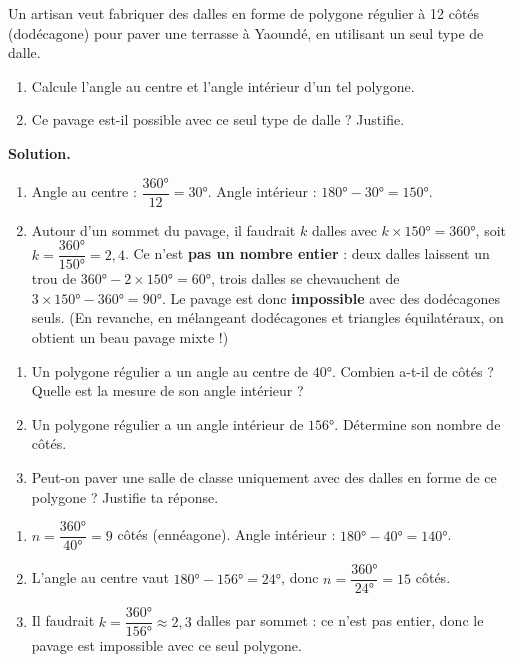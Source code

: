 \documentclass[11pt]{article}
\begin{document}
\begin{exoresolu}
Un artisan veut fabriquer des dalles en forme de polygone régulier à 12 côtés (dodécagone) pour paver une terrasse à Yaoundé, en utilisant un seul type de dalle.
\begin{enumerate}
\item Calcule l'angle au centre et l'angle intérieur d'un tel polygone.
\item Ce pavage est-il possible avec ce seul type de dalle ? Justifie.
\end{enumerate}
\tcblower
\textbf{Solution.}
\begin{enumerate}
\item Angle au centre : $\dfrac{360°}{12} = 30°$. Angle intérieur : $180° - 30° = 150°$.
\item Autour d'un sommet du pavage, il faudrait $k$ dalles avec $k \times 150° = 360°$, soit $k = \dfrac{360°}{150°} = 2{,}4$. Ce n'est \textbf{pas un nombre entier} : deux dalles laissent un trou de $360° - 2 \times 150° = 60°$, trois dalles se chevauchent de $3 \times 150° - 360° = 90°$. Le pavage est donc \textbf{impossible} avec des dodécagones seuls. (En revanche, en mélangeant dodécagones et triangles équilatéraux, on obtient un beau pavage mixte !)
\end{enumerate}
\end{exoresolu}

\begin{exercice}
\begin{enumerate}
\item Un polygone régulier a un angle au centre de $40°$. Combien a-t-il de côtés ? Quelle est la mesure de son angle intérieur ?
\item Un polygone régulier a un angle intérieur de $156°$. Détermine son nombre de côtés.
\item Peut-on paver une salle de classe uniquement avec des dalles en forme de ce polygone ? Justifie ta réponse.
\end{enumerate}
\end{exercice}

\begin{corrige}
\begin{enumerate}
\item $n = \dfrac{360°}{40°} = 9$ côtés (ennéagone). Angle intérieur : $180° - 40° = 140°$.
\item L'angle au centre vaut $180° - 156° = 24°$, donc $n = \dfrac{360°}{24°} = 15$ côtés.
\item Il faudrait $k = \dfrac{360°}{156°} \approx 2{,}3$ dalles par sommet : ce n'est pas entier, donc le pavage est impossible avec ce seul polygone.
\end{enumerate}
\end{corrige}
\end{document}
